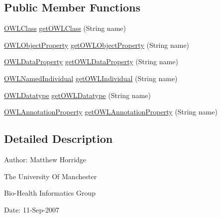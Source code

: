 \subsection*{Public Member Functions}
\begin{DoxyCompactItemize}
\item 
\hyperlink{interfaceorg_1_1semanticweb_1_1owlapi_1_1model_1_1_o_w_l_class}{O\-W\-L\-Class} \hyperlink{interfaceorg_1_1semanticweb_1_1owlapi_1_1expression_1_1_o_w_l_entity_checker_aadf4bcd04edbc41b9a9662fbf87a4fb3}{get\-O\-W\-L\-Class} (String name)
\item 
\hyperlink{interfaceorg_1_1semanticweb_1_1owlapi_1_1model_1_1_o_w_l_object_property}{O\-W\-L\-Object\-Property} \hyperlink{interfaceorg_1_1semanticweb_1_1owlapi_1_1expression_1_1_o_w_l_entity_checker_a881fd858a1cf520ee79b549c119e868e}{get\-O\-W\-L\-Object\-Property} (String name)
\item 
\hyperlink{interfaceorg_1_1semanticweb_1_1owlapi_1_1model_1_1_o_w_l_data_property}{O\-W\-L\-Data\-Property} \hyperlink{interfaceorg_1_1semanticweb_1_1owlapi_1_1expression_1_1_o_w_l_entity_checker_adf839848ae50292ed184cf34a93ea7e4}{get\-O\-W\-L\-Data\-Property} (String name)
\item 
\hyperlink{interfaceorg_1_1semanticweb_1_1owlapi_1_1model_1_1_o_w_l_named_individual}{O\-W\-L\-Named\-Individual} \hyperlink{interfaceorg_1_1semanticweb_1_1owlapi_1_1expression_1_1_o_w_l_entity_checker_a76d99c6298a971a0c9e45f324fbd05c3}{get\-O\-W\-L\-Individual} (String name)
\item 
\hyperlink{interfaceorg_1_1semanticweb_1_1owlapi_1_1model_1_1_o_w_l_datatype}{O\-W\-L\-Datatype} \hyperlink{interfaceorg_1_1semanticweb_1_1owlapi_1_1expression_1_1_o_w_l_entity_checker_a007236f01fa75afad7918178179b9ee3}{get\-O\-W\-L\-Datatype} (String name)
\item 
\hyperlink{interfaceorg_1_1semanticweb_1_1owlapi_1_1model_1_1_o_w_l_annotation_property}{O\-W\-L\-Annotation\-Property} \hyperlink{interfaceorg_1_1semanticweb_1_1owlapi_1_1expression_1_1_o_w_l_entity_checker_ade823c92483bb21730805573c0b1dddc}{get\-O\-W\-L\-Annotation\-Property} (String name)
\end{DoxyCompactItemize}


\subsection{Detailed Description}
Author\-: Matthew Horridge\par
 The University Of Manchester\par
 Bio-\/\-Health Informatics Group\par
 Date\-: 11-\/\-Sep-\/2007\par
\par


